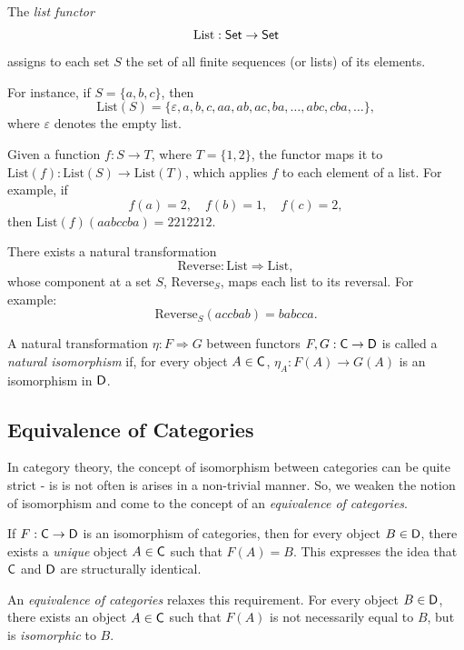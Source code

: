 \begin{example}
The \emph{list functor}
\[
\mathrm{List} : \mathsf{Set} \to \mathsf{Set}
\]
assigns to each set \( S \) the set of all finite sequences (or lists) of its elements. 

For instance, if \( S = \{a, b, c\} \), then
\[
\mathrm{List}(S) = \{\varepsilon, a, b, c, aa, ab, ac, ba, \ldots, abc, cba, \ldots\},
\]
where \( \varepsilon \) denotes the empty list.

Given a function \( f : S \to T \), where $T=\{1,2\} $, the functor maps it to \(\mathrm{List}(f) : \mathrm{List}(S) \to \mathrm{List}(T)\), which applies \( f \) to each element of a list. For example, if
\[
f(a) = 2, \quad f(b) = 1, \quad f(c) = 2,
\]
then \(\mathrm{List}(f)(aabccba) = 2212212\).

There exists a natural transformation
\[
\mathrm{Reverse} : \mathrm{List} \Rightarrow \mathrm{List},
\]
whose component at a set \(S\), \(\mathrm{Reverse}_S\), maps each list to its reversal. For example:
\[
\mathrm{Reverse}_S(accbab) = babcca.
\]

\end{example}


\begin{definition}
  A natural transformation $\eta : F \Rightarrow G$ between functors $F, G : \mathsf{C} \to \mathsf{D}$ is called a \emph{natural isomorphism} if, for every object $A \in \mathsf{C}$,  $\eta_A : F(A) \to G(A)$ is an isomorphism in $\mathsf{D}$.
\end{definition}


\subsection{Equivalence of Categories}

In category theory, the concept of isomorphism between categories can be quite strict - is is not often is arises in a non-trivial manner. So, we weaken the notion of isomorphism and come to the concept of an \emph{equivalence of categories}.

If \( F: \mathsf{C} \to \mathsf{D} \) is an isomorphism of categories, then for every object \( B \in \mathsf{D} \), there exists a \emph{unique} object \( A \in \mathsf{C} \) such that \( F(A) = B \). This expresses the idea that \( \mathsf{C} \) and \( \mathsf{D} \) are structurally identical.

An \emph{equivalence of categories} relaxes this requirement. For every object \( B \in \mathsf{D} \), there exists an object \( A \in \mathsf{C} \) such that \( F(A) \) is not necessarily equal to \( B \), but is \emph{isomorphic} to \( B \). 

